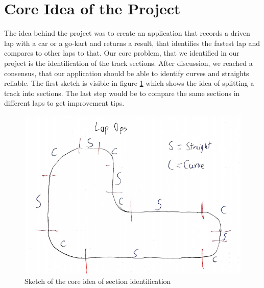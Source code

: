 \section{Core Idea of the Project}
The idea behind the project was to create an application that records a driven lap with a car or a go-kart and returns a result, that identifies the fastest lap and compares to other laps to that. Our core problem, that we identified in our project is the identification of the track sections. After discussion, we reached a consensus, that our application should be able to identify curves and straights reliable. The first sketch is visible in figure \ref{sketchLapOps} which shows the idea of splitting a track into sections. The last step would be to compare the same sections in different laps to get improvement tips.

\begin{figure}[H]
	\centering
	\includegraphics[scale= 0.6]{Pictures/LapOpsSkizze.png}
	\caption{Sketch of the core idea of section identification}
	\label{sketchLapOps}
\end{figure}
